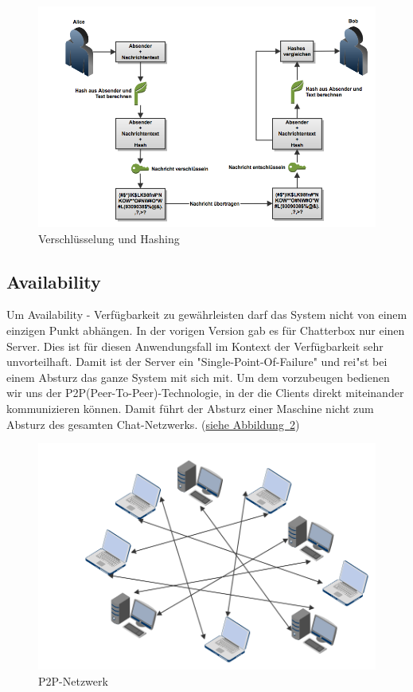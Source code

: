 \documentclass[12pt,a4paper,titlepage,oneside]{scrartcl}
\begin{document}
\begin{figure}[h!]
  \centering
    \includegraphics[width=1.0\textwidth]{./imgs/encryption.png}
  \caption{Verschl\"usselung und Hashing}
  \label{fig:encryption}
\end{figure}

\subsection{Availability}
Um Availability - Verf\"ugbarkeit zu gew\"ahrleisten darf das System nicht von einem einzigen Punkt abh\"angen. In der vorigen Version gab es f\"ur Chatterbox nur einen Server. Dies ist f\"ur diesen Anwendungsfall im Kontext der Verf\"ugbarkeit sehr unvorteilhaft. Damit ist der Server ein "Single-Point-Of-Failure" und rei"st bei einem Absturz das ganze System mit sich mit. Um dem vorzubeugen bedienen wir uns der P2P(Peer-To-Peer)-Technologie, in der die Clients direkt miteinander kommunizieren k\"onnen. Damit f\"uhrt der Absturz einer Maschine nicht zum Absturz des gesamten Chat-Netzwerks. (\hyperref[fig:p2p]{siehe Abbildung~\ref*{fig:p2p}})

\begin{figure}[h!]
  \centering
    \includegraphics[width=1.0\textwidth]{./imgs/p2p.png}
  \caption{P2P-Netzwerk}
  \label{fig:p2p}
\end{figure}
\end{document}
